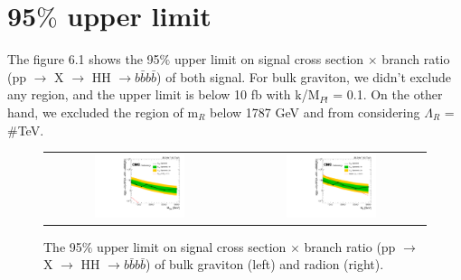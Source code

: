 \clearpage
\section{95$\% $ upper limit}
The figure 6.1 shows the 95$\% $ upper limit on signal cross section $\times $ branch ratio (pp $\rightarrow$ X $\rightarrow$ HH $\rightarrow b\bar{b}b\bar{b}$) of both signal. For bulk graviton, we didn't exclude any region, and the upper limit is below 10 fb with k/M$_{Pl}$ = 0.1. On the other hand, we excluded the region of m$_{R}$ below 1787 GeV and from   considering $\Lambda_{R}$ = #TeV.

 \begin{figure}[t]
  \centering
 \begin{tabular}{cc}
    \includegraphics[width=0.5\textwidth]{Figures/central_CW/limit.pdf} &
   \includegraphics[width=0.5\textwidth]{Figures/central_CW_rd/limit.pdf} \\
  \end{tabular}
  \caption{The 95$\% $ upper limit on signal cross section $\times $ branch ratio (pp $\rightarrow$ X $\rightarrow$ HH $\rightarrow b\bar{b}b\bar{b}$) of bulk graviton (left) and radion (right).}
  \label{fig:hvt_brs}
\end{figure} 

